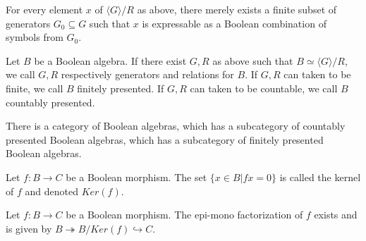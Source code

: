 \documentclass{../util/zariski-small}
\begin{document}
\begin{remark}
  For every element $x$ of $\langle G\rangle /R$ as above,
  there merely exists a finite subset of generators $G_0\subseteq G$ such that $x$ is expressable 
  as a Boolean combination of symbols from $G_0$. 
\end{remark}
\begin{definition}
  Let $B$ be a Boolean algebra. 
  If there exist $G, R$ as above such that 
  $B \simeq \langle G \rangle /R$, 
  we call $G,R$ respectively generators and relations for $B$. 
  If $G,R$ can taken to be finite, we call $B$ finitely presented. 
  If $G,R$ can taken to be countable, we call $B$ countably presented. 
\end{definition}
\begin{remark}
  There is a category of Boolean algebras, which has a subcategory of countably presented Boolean algebras, 
  which has a subcategory of finitely presented Boolean algebras. 
\end{remark}
\begin{definition}
  Let $f:B\to C$ be a Boolean morphism. 
  The set $\{x \in B| fx = 0\}$ is called the kernel of $f$ and denoted 
  $Ker(f)$. 
\end{definition}
\begin{remark}
  Let $f:B \to C$ be a Boolean morphism. 
  The epi-mono factorization of $f$ exists and is given by  
  $B \twoheadrightarrow B / Ker(f) \hookrightarrow C$.
\end{remark}
\end{document}
